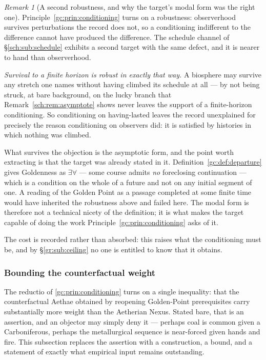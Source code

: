 \documentclass[11pt]{article}
\numberwithin{equation}{section}
\theoremstyle{plain}
\theoremstyle{definition}
\theoremstyle{remark}
\newtheorem{remark}[theorem]{Remark}
\begin{document}
\begin{remark}[A second robustness, and why the target's modal form was
the right one]\label{gc:rem:finitehorizon}
Principle~\ref{gc:prin:conditioning} turns on a robustness: observerhood
survives perturbations the record does not, so a conditioning
indifferent to the difference cannot have produced the difference. The
schedule channel of \S\ref{sch:sub:schedule} exhibits a second target
with the same defect, and it is nearer to hand than observerhood.

\emph{Survival to a finite horizon is robust in exactly that way.} A
biosphere may survive any stretch one names without having climbed its
schedule at all --- by not being struck, at bare background, on the
lucky branch that Remark~\ref{sch:rem:asymptote} shows never leaves the
support of a finite-horizon conditioning. So conditioning on
having-lasted leaves the record unexplained for precisely the reason
conditioning on observers did: it is satisfied by histories in which
nothing was climbed.

What survives the objection is the asymptotic form, and the point worth
extracting is that the target was already stated in it.
Definition~\ref{gc:def:departure} gives Goldenness as $\exists\forall$
--- some course admits \emph{no} foreclosing continuation --- which is a
condition on the whole of a future and not on any initial segment of
one. A reading of the Golden Point as a passage completed at some finite
time would have inherited the robustness above and failed here. The
modal form is therefore not a technical nicety of the definition; it is
what makes the target capable of doing the work
Principle~\ref{gc:prin:conditioning} asks of it.

The cost is recorded rather than absorbed: this raises what the
conditioning must be, and by \S\ref{gr:sub:ceiling} no one is entitled
to know that it obtains.
\end{remark}

\subsubsection{Bounding the counterfactual weight}
\label{gc:subsub:weightbound}

The reductio of \ref{gc:prin:conditioning} turns on a single inequality:
that the counterfactual Aethae obtained by reopening Golden-Point
prerequisites carry substantially more weight than the Aetherian Nexus.
Stated bare, that is an assertion, and an objector may simply deny it ---
perhaps coal is common given a Carboniferous, perhaps the metallurgical
sequence is near-forced given hands and fire. This subsection replaces
the assertion with a construction, a bound, and a statement of exactly
what empirical input remains outstanding.
\end{document}
